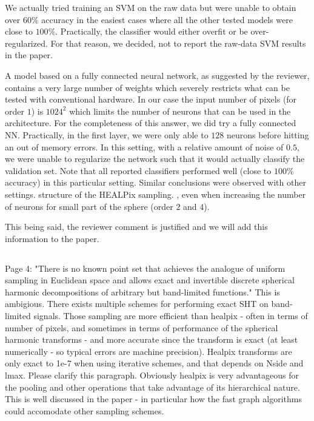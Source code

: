 \documentclass[12pt,a4paper]{article}
\newcommand{\nati}[1]{{\color[rgb]{.1,.6,.1}{NP: #1}}}
\newcommand{\todo}[1]{{\color[rgb]{.6,.1,.6}{TODO: #1}}}
\newcommand{\1}{\b{1}}              %
\newcommand{\0}{\b{0}}              %
\begin{document}
We actually tried training an SVM on the raw data but were unable to obtain over $60\%$ accuracy in the easiest cases where all the other tested models were close to $100\%$. Practically, the classifier would either overfit or be over-regularized. For that reason, we decided, not to report the raw-data SVM results in the paper.  
\nati{FYI, I did try again to be entirely sure about it.}

A model based on a fully connected neural network, as suggested by the reviewer, contains a very large number of weights which severely restricts what can be tested with conventional hardware. In our case the input number of pixels (for order $1$) is $1024^2$ which limits the number of neurons that can be used in the architecture. For the completeness of this answer, we did try a fully connected NN. Practically, in the first layer, we were only able to $128$ neurons before hitting an out of memory errors. In this setting, with a relative amount of noise of $0.5$, we were unable to regularize the network such that it would actually classify the validation set. Note that all reported classifiers performed well (close to $100\%$ accuracy) in this particular setting. Similar conclusions were observed with other settings.
structure of the HEALPix sampling. , even when increasing the number of neurons for small part of the sphere (order $2$ and $4$).

This being said, the reviewer comment is justified and we will add this information to the paper. 

\todo{Add it in the paper... Make clear that CNN is so much better than fully connected + say that SVM on the raw features does not work.}


\subsection{}
\begin{mdframed}[style=comment] 
Page 4: "There is no known point set that achieves the analogue of uniform sampling in Euclidean space and allows exact and invertible discrete spherical harmonic decompositions of arbitrary but band-limited functions." This is ambigious. There exists multiple schemes for performing exact SHT on band-limited signals. Those sampling are more efficient than healpix - often in terms of number of pixels, and sometimes in terms of performance of the spherical harmonic transforms - and more accurate since the transform is exact (at least numerically - so typical errors are machine precision). Healpix transforms are only exact to 1e-7 when using iterative schemes, and that depends on Nside and lmax. Please clarify this paragraph. Obviously healpix is very advantageous for the pooling and other operations that take advantage of its hierarchical nature. This is well discussed in the paper - in particular how the fast graph algorithms could accomodate other sampling schemes.
\end{mdframed}
\end{document}
